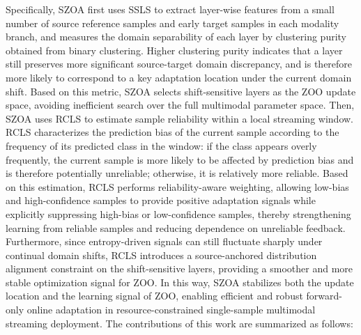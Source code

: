 Specifically, SZOA first uses SSLS to extract layer-wise features from a small number of source reference samples and early target samples in each modality branch, and measures the domain separability of each layer by clustering purity obtained from binary clustering.
Higher clustering purity indicates that a layer still preserves more significant source-target domain discrepancy, and is therefore more likely to correspond to a key adaptation location under the current domain shift.
Based on this metric, SZOA selects shift-sensitive layers as the ZOO update space, avoiding inefficient search over the full multimodal parameter space.
Then, SZOA uses RCLS to estimate sample reliability within a local streaming window.
RCLS characterizes the prediction bias of the current sample according to the frequency of its predicted class in the window: if the class appears overly frequently, the current sample is more likely to be affected by prediction bias and is therefore potentially unreliable; otherwise, it is relatively more reliable.
Based on this estimation, RCLS performs reliability-aware weighting, allowing low-bias and high-confidence samples to provide positive adaptation signals while explicitly suppressing high-bias or low-confidence samples, thereby strengthening learning from reliable samples and reducing dependence on unreliable feedback.
Furthermore, since entropy-driven signals can still fluctuate sharply under continual domain shifts, RCLS introduces a source-anchored distribution alignment constraint on the shift-sensitive layers, providing a smoother and more stable optimization signal for ZOO.
In this way, SZOA stabilizes both the update location and the learning signal of ZOO, enabling efficient and robust forward-only online adaptation in resource-constrained single-sample multimodal streaming deployment.
The contributions of this work are summarized as follows:

